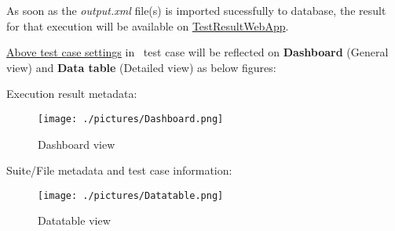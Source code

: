As soon as the \emph{output.xml} file(s) is imported sucessfully to database,
the result for that execution will be available on
\href{https://github.com/test-fullautomation/testresultwebapp}{TestResultWebApp}.

\hyperref[description-robotframework-testcase-settings]{Above test case settings}
in \rfwcore\ test case will be reflected on \textbf{Dashboard} (General view)
and \textbf{Data table} (Detailed view) as below figures:

Execution result metadata:

\begin{figure}[h!]
  \texttt{[image: ./pictures/Dashboard.png]}
  \caption{Dashboard view}
\end{figure}

Suite/File metadata and test case information:

\begin{figure}[h!]
  \texttt{[image: ./pictures/Datatable.png]}
  \caption{Datatable view}
\end{figure}
